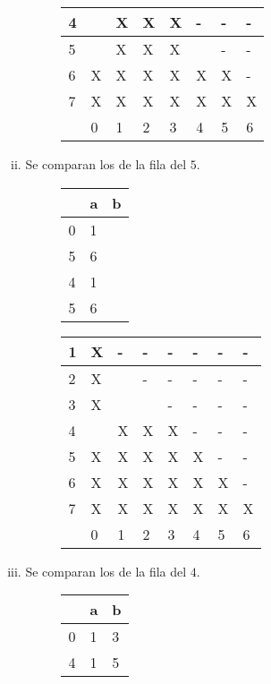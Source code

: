 \documentclass[11pt,a4paper]{article}
\begin{document}
\begin{enumerate}[a)]
\begin{enumerate}[I.]
\begin{enumerate}[i.]
\begin{figure}[H]
\begin{tabular}{|l|l|l|l|l|l|l|l|}
					4 &   & X & X & X & - & - & - \\ \hline
					5 &	  & X & X & X &   & - & - \\ \hline
					6 & X & X & X & X & X & X & - \\ \hline
					7 & X & X & X & X & X & X & X \\ \hline
			  		  & 0 & 1 & 2 & 3 & 4 & 5 & 6 \\ \hline
					\end{tabular}
				\end{figure}
				\item Se comparan los de la fila del $5$.
				\begin{figure}[H]
				\centering
					\begin{tabular}{l|ll}
					  & a & b \\ \hline
					0 & 1 &   \\
					5 & 6 &   \\ \hline
					4 & 1 &   \\
					5 & 6 &   \\ 
					\end{tabular}
				\end{figure}
				\begin{figure}[H]
				\centering
					\begin{tabular}{|l|l|l|l|l|l|l|l|}
					\hline
					1 & X & - & - & - & - & - & - \\ \hline
					2 & X &   & - & - & - & - & - \\ \hline
					3 & X &   &   & - & - & - & - \\ \hline
					4 &   & X & X & X & - & - & - \\ \hline
					5 &	X & X & X & X & X & - & - \\ \hline
					6 & X & X & X & X & X & X & - \\ \hline
					7 & X & X & X & X & X & X & X \\ \hline
			  		  & 0 & 1 & 2 & 3 & 4 & 5 & 6 \\ \hline
					\end{tabular}
				\end{figure}
				\item Se comparan los de la fila del $4$.
				\begin{figure}[H]
				\centering
					\begin{tabular}{l|ll}
					  & a & b \\ \hline
					0 & 1 & 3 \\
					4 & 1 & 5 \\ 
					\end{tabular}

\end{figure}
\end{enumerate}
\end{enumerate}
\end{enumerate}
\end{document}
